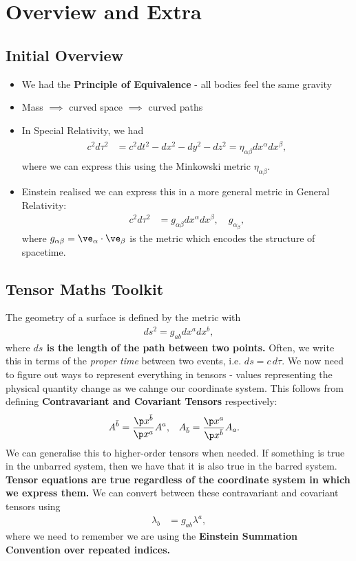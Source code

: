 \documentclass[a4paper, 11pt, normalem]{report}
\begin{document}
\chapter{Overview and Extra}
\section{Initial Overview}
\begin{itemize}
    \item We had the \textbf{Principle of Equivalence} - all bodies feel the same gravity
    \item Mass $\implies$ curved space $\implies$ curved paths %
    \item In Special Relativity, we had
        \begin{align}
            \begin{split}
                c^2d\tau^2 &= c^2dt^2 - dx^2 - dy^2 - dz^2 = \eta_{\alpha\beta}dx^\alpha dx^\beta,
            \end{split}
        \end{align}
        where we can express this using the Minkowski metric $\eta_{\alpha\beta}$.
    \item Einstein realised we can express this in a more general metric in General Relativity:
        \begin{align}
            c^2d\tau^2 &= g_{\alpha\beta}dx^\alpha dx^\beta,\quad g_{\alpha_\beta},
        \end{align}
        where $g_{\alpha\beta}=\ve_\alpha\cdot\ve_\beta$ is the metric which encodes the structure of spacetime.
\end{itemize}

\section{Tensor Maths Toolkit}
The geometry of a surface is defined by the metric with 
\begin{align}
    ds^2 = g_{ab}dx^adx^b,
\end{align}
where \textbf{$ds$ is the length of the path between two points.}
Often, we write this in terms of the \emph{proper time} between two events, i.e. $ds=c\,d\tau$.
We now need to figure out ways to represent everything in tensors - values representing the physical quantity change as we cahnge our coordinate system.
This follows from defining \textbf{Contravariant and Covariant Tensors} respectively:
\begin{align}
    A^{\bar{b}} &= \frac{\p x^{\bar{b}}}{\p x^a}A^a, & A_{\bar{b}} &= \frac{\p x^a}{\p x^{\bar{b}}}A_a.
\end{align}
We can generalise this to higher-order tensors when needed. 
If something is true in the unbarred system, then we have that it is also true in the barred system.
\textbf{Tensor equations are true regardless of the coordinate system in which we express them.}
We can convert between these contravariant and covariant tensors using
\begin{align}
    \lambda_b &= g_{ab}\lambda^a,
\end{align}
where we need to remember we are using the \textbf{Einstein Summation Convention over repeated indices.}
\end{document}
